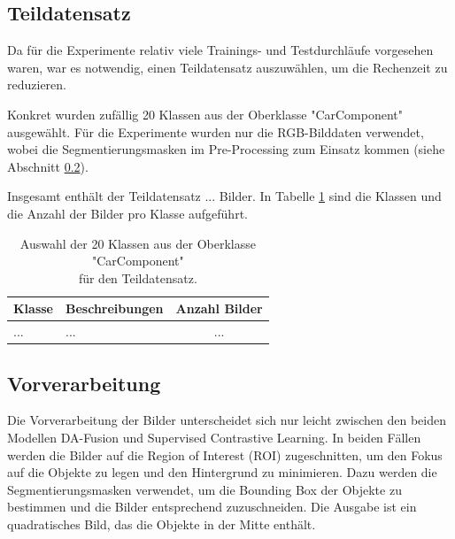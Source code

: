 \subsection{Teildatensatz} \label{sec:subdataset}

Da für die Experimente relativ viele Trainings- und Testdurchläufe vorgesehen waren, war es notwendig, einen Teildatensatz auszuwählen, um die Rechenzeit zu reduzieren.

Konkret wurden zufällig 20 Klassen aus der Oberklasse "CarComponent" ausgewählt. Für die Experimente wurden nur die RGB-Bilddaten verwendet, wobei die Segmentierungsmasken im Pre-Processing zum Einsatz kommen (siehe Abschnitt \ref{sec:preprocessing}).

Insgesamt enthält der Teildatensatz ... Bilder. In Tabelle \ref{tab:subdataset} sind die Klassen und die Anzahl der Bilder pro Klasse aufgeführt.

\begin{table}[h]
	\caption{Auswahl der 20 Klassen aus der Oberklasse "CarComponent"\\
	für den Teildatensatz.}
	\begin{tabular}{|l|l|c|}
		\hline
		\textbf{Klasse} & \textbf{Beschreibungen} & \textbf{Anzahl Bilder} \\
		\hline
		... & ... & ... \\
		\hline
	\end{tabular}
	\label{tab:subdataset}
\end{table}

\subsection{Vorverarbeitung} \label{sec:preprocessing}

Die Vorverarbeitung der Bilder unterscheidet sich nur leicht zwischen den beiden Modellen DA-Fusion und Supervised Contrastive Learning. In beiden Fällen werden die Bilder auf die Region of Interest (ROI) zugeschnitten, um den Fokus auf die Objekte zu legen und den Hintergrund zu minimieren. Dazu werden die Segmentierungsmasken verwendet, um die Bounding Box der Objekte zu bestimmen und die Bilder entsprechend zuzuschneiden. Die Ausgabe ist ein quadratisches Bild, das die Objekte in der Mitte enthält.

